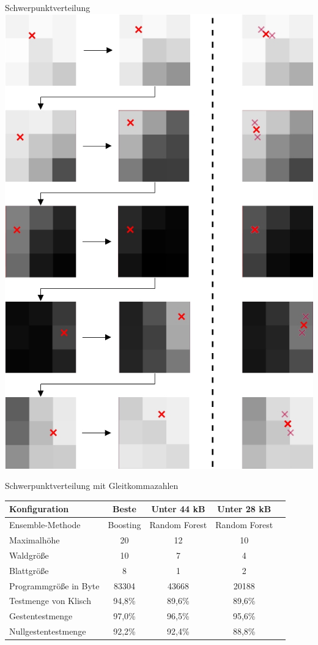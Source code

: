 \documentclass[10pt]{beamer}
\begin{document}
\begin{frame}{Schwerpunktverteilung}
    \centering
    \includegraphics[width=0.5\linewidth]{schwerpunktverteilung.jpg}
\end{frame}

\begin{frame}{Schwerpunktverteilung mit Gleitkommazahlen}
    \hspace*{-0.5cm}
    \begin{tabular}{ | p{4cm} | c | c | c | c |}
        \hline
        Konfiguration & Beste & Unter 44 kB & Unter 28 kB \\\hline
        Ensemble-Methode & Boosting & Random Forest & Random Forest  \\\hline
        Maximalhöhe & 20 & 12 & 10 \\\hline
        Waldgröße & 10 & 7 & 4 \\\hline
        Blattgröße & 8 & 1 & 2 \\\hline
        Programmgröße in Byte & 83304 & 43668 & 20188 \\\hline
        Testmenge von Klisch & 94,8\% & 89,6\% & 89,6\% \\\hline
        Gestentestmenge & 97,0\% & 96,5\% & 95,6\% \\\hline
        Nullgestentestmenge & 92,2\% & 92,4\% & 88,8\% \\\hline
    \end{tabular}
\end{frame}
\end{document}
